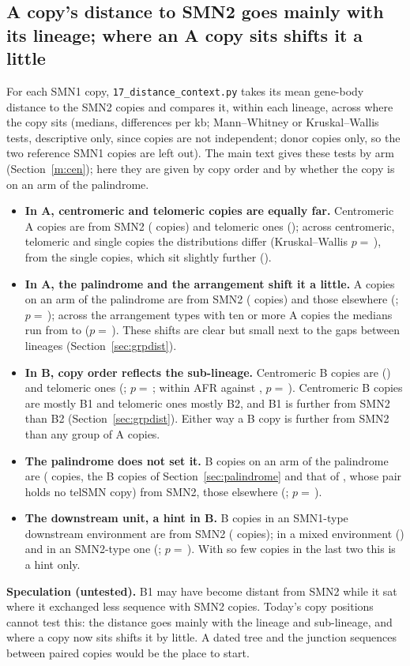 \subsection{A copy's distance to SMN2 goes mainly with its lineage; where an A copy sits shifts it a little}\label{sec:distctx}
For each SMN1 copy, \texttt{17\_distance\_context.py} takes its mean gene-body distance to the SMN2 copies and compares
it, within each lineage, across where the copy sits (medians, differences per kb; Mann--Whitney or Kruskal--Wallis
tests, descriptive only, since copies are not independent; donor copies only, so the two reference SMN1 copies are
left out). The main text gives these tests by arm (Section~\ref{m:cen}); here they are given by copy order and by whether the copy is on an arm of the palindrome.
\begin{itemize}
\item \textbf{In A, centromeric and telomeric copies are equally far.} Centromeric A copies are \dcACen{} from SMN2
(\dcACenN{} copies) and telomeric ones \dcATel{} (\dcATelN); across centromeric, telomeric and single copies the
distributions differ (Kruskal--Wallis $p=$\,\dcPAPos), from the single copies, which sit slightly further (\dcASingle).
\item \textbf{In A, the palindrome and the arrangement shift it a little.} A copies on an arm of the  palindrome
are \dcAPalYes{} from SMN2 (\dcAPalYesN{} copies) and those elsewhere \dcAPalNo{} (\dcAPalNoN; $p=$\,\dcPAPal); across
the arrangement types with ten or more A copies the medians run from \dcAArrMin{} to \dcAArrMax{} ($p=$\,\dcPAArr).
These shifts are clear but small next to the gaps between
lineages (Section~\ref{sec:grpdist}).
\item \textbf{In B, copy order reflects the sub-lineage.} Centromeric B copies are \dcBCen{} (\dcBCenN) and telomeric
ones \dcBTel{} (\dcBTelN; $p=$\,\dcPBPos; within AFR \dcAfrBCen{} against \dcAfrBTel, $p=$\,\dcPAfrBPos). Centromeric B
copies are mostly B1 and telomeric ones mostly B2, and B1 is further from SMN2 than B2 (Section~\ref{sec:grpdist}).
Either way a B copy is further from SMN2 than any group of A copies.
\item \textbf{The palindrome does not set it.} B copies on an arm of the  palindrome are \dcBPalYes{}
(\dcBPalYesN{} copies, the \palSmnB{} B copies of Section~\ref{sec:palindrome} and that of \palNoCopyHap, whose  pair holds no telSMN copy) from SMN2, those elsewhere \dcBPalNo{} (\dcBPalNoN; $p=$\,\dcPBPal).
\item \textbf{The downstream unit, a hint in B.} B copies in an SMN1-type downstream environment are \dcBEnvOne{} from
SMN2 (\dcBEnvOneN{} copies); in a mixed environment \dcBEnvMixed{} (\dcBEnvMixedN) and in an SMN2-type one \dcBEnvTwo{}
(\dcBEnvTwoN; $p=$\,\dcPBEnv). With so few copies in the last two this is a hint only.
\end{itemize}
\textbf{Speculation (untested).} B1 may have become distant from SMN2 while it sat where it exchanged less sequence with
SMN2 copies. Today's copy positions cannot test this: the distance goes mainly with the lineage and sub-lineage, and where
a copy now sits shifts it by little. A dated tree and the junction sequences between paired copies would be the place to start.

